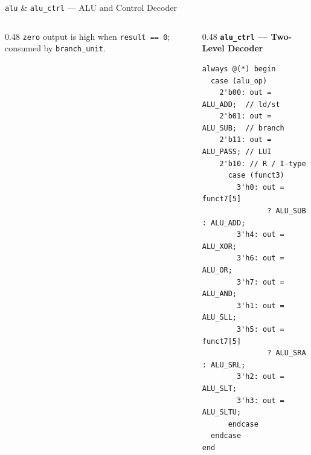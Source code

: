 \documentclass[aspectratio=169,10pt]{beamer}
\begin{document}
\begin{frame}[fragile]{\texttt{alu} \& \texttt{alu\_ctrl} --- ALU and Control Decoder}
\begin{columns}[T]
\begin{column}{0.48\textwidth}
      \vspace{0.4em}
      \small\texttt{zero} output is high when \texttt{result == 0}; consumed by \texttt{branch\_unit}.
    \end{column}
    \begin{column}{0.48\textwidth}
      \textbf{\texttt{alu\_ctrl} --- Two-Level Decoder}
\begin{lstlisting}
always @(*) begin
  case (alu_op)
    2'b00: out = ALU_ADD;  // ld/st
    2'b01: out = ALU_SUB;  // branch
    2'b11: out = ALU_PASS; // LUI
    2'b10: // R / I-type
      case (funct3)
        3'h0: out = funct7[5]
               ? ALU_SUB : ALU_ADD;
        3'h4: out = ALU_XOR;
        3'h6: out = ALU_OR;
        3'h7: out = ALU_AND;
        3'h1: out = ALU_SLL;
        3'h5: out = funct7[5]
               ? ALU_SRA : ALU_SRL;
        3'h2: out = ALU_SLT;
        3'h3: out = ALU_SLTU;
      endcase
  endcase
end
\end{lstlisting}
    \end{column}
  \end{columns}
\end{frame}
\end{document}
